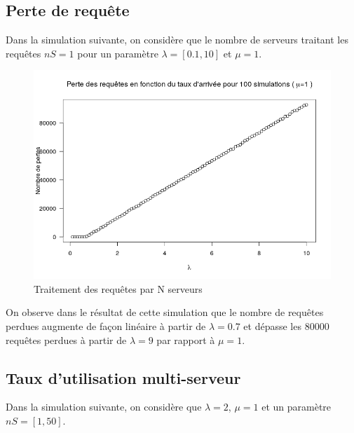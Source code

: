 \documentclass[12pt,a4paper]{article}
\begin{document}
    \subsection{Perte de requête}
    \par Dans la simulation suivante, on considère que le nombre de serveurs traitant les requêtes $nS = 1$ pour un paramètre $\lambda = [{0.1},{10}]$ et $ \mu = 1$.
    
    \begin{center}
        \begin{figure}[H]
            \includegraphics[scale=0.7]{lostQueries.png}
            \caption{Traitement des requêtes par N serveurs}
        \end{figure}
    \end{center}
    
    On observe dans le résultat de cette simulation que le nombre de requêtes perdues augmente de façon linéaire à partir de $\lambda = 0.7$ et dépasse les 80000 requêtes perdues à partir de $\lambda = 9$ par rapport à $\mu = 1$.
    
    \subsection{Taux d'utilisation multi-serveur}
    \par Dans la simulation suivante, on considère que $\lambda = 2$, $\mu = 1$ et un paramètre $nS = [{1},{50}]$.
    
\end{document}
